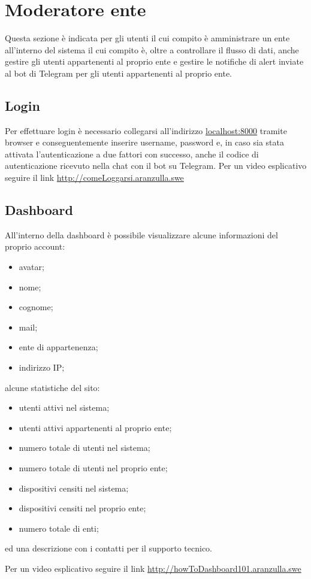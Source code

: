 \section{Moderatore ente}
Questa sezione è indicata per gli utenti il cui compito è amministrare un ente all'interno del sistema il cui compito è, oltre a controllare il flusso di dati, anche gestire gli utenti appartenenti al proprio ente e gestire le notifiche di alert inviate al bot di Telegram per gli utenti appartenenti al proprio ente.

\subsection{Login}
Per effettuare login è necessario collegarsi all'indirizzo \url{localhost:8000} tramite browser e conseguentemente inserire username, password e, in caso sia stata attivata l'autenticazione a due fattori con successo, anche il codice di autenticazione ricevuto nella chat con il bot su Telegram.
Per un video esplicativo seguire il link \url{http://comeLoggarsi.aranzulla.swe}

\subsection{Dashboard}
All'interno della dashboard è possibile visualizzare alcune informazioni del proprio account:
\begin{itemize}
	\item avatar;
	\item nome;
	\item cognome;
	\item mail;
	\item ente di appartenenza;
	\item indirizzo IP;
\end{itemize}

alcune statistiche del sito:
\begin{itemize}
	\item utenti attivi nel sistema;
	\item utenti attivi appartenenti al proprio ente;
	\item numero totale di utenti nel sistema;
	\item numero totale di utenti nel proprio ente;
	\item dispositivi censiti nel sistema;
	\item dispositivi censiti nel proprio ente;
	\item numero totale di enti;
\end{itemize}

ed una descrizione con i contatti per il supporto tecnico.

Per un video esplicativo seguire il link \url{http://howToDashboard101.aranzulla.swe}